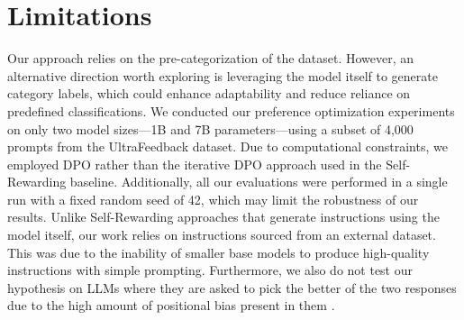 \section{Limitations}
Our approach relies on the pre-categorization of the dataset. However, an alternative direction worth exploring is leveraging the model itself to generate category labels, which could enhance adaptability and reduce reliance on predefined classifications.
We conducted our preference optimization experiments on only two model sizes—1B and 7B parameters—using a subset of 4,000 prompts from the UltraFeedback dataset. Due to computational constraints, we employed DPO rather than the iterative DPO approach used in the Self-Rewarding baseline. Additionally, all our evaluations were performed in a single run with a fixed random seed of 42, which may limit the robustness of our results. Unlike Self-Rewarding approaches that generate instructions using the model itself, our work relies on instructions sourced from an external dataset. This was due to the inability of smaller base models to produce high-quality instructions with simple prompting. Furthermore, we also do not test our hypothesis on LLMs where they are asked to pick the better of the two responses due to the high amount of positional bias present in them \citep{zheng2023large,li-etal-2024-split}. 